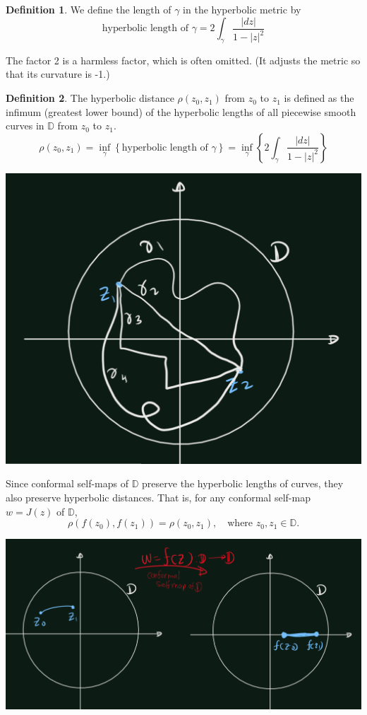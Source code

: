 \documentclass[
]{book}
\theoremstyle{definition}
\newtheorem{definition}{Definition}[chapter]
\theoremstyle{definition}
\theoremstyle{definition}
\theoremstyle{definition}
\theoremstyle{remark}
\begin{document}
\begin{definition}
\protect\hypertarget{def:unnamed-chunk-35}{}\label{def:unnamed-chunk-35}We define the length of \(\gamma\) in the hyperbolic metric by
\[\text{hyperbolic length of } \gamma =2\int_{\gamma} \frac{|dz|}{1-|z|^2}\]
\end{definition}

The factor 2 is a harmless factor, which is often omitted. (It adjusts the
metric so that its curvature is -1.)

\begin{definition}
\protect\hypertarget{def:unnamed-chunk-36}{}\label{def:unnamed-chunk-36}The hyperbolic distance \(\rho(z_0, z_1)\) from \(z_0\) to \(z_1\) is defined as the infimum (greatest lower bound) of the hyperbolic lengths of all piecewise smooth curves in \(\mathbb{D}\) from \(z_0\) to \(z_1\).
\[\rho(z_0, z_1)
  =\inf_\gamma\left\{\text{hyperbolic length of } \gamma \right\}
  =\inf_\gamma\left\{2\int_{\gamma} \frac{|dz|}{1-|z|^2}\right\}\]
\end{definition}

\includegraphics[width=14.76in]{figures/Riemann_Mapping_Therom/fig1}

Since conformal self-maps of \(\mathbb{D}\) preserve the hyperbolic lengths of curves, they also preserve hyperbolic distances. That is, for any conformal self-map \(w = J(z)\) of \(\mathbb{D}\),
\[ \rho(f(z_0), f(z_1)) = \rho(z_0, z_1), \quad \text{where } z_0, z_1 \in \mathbb{D}. \]

\includegraphics[width=23.78in]{figures/Riemann_Mapping_Therom/fig2}
\end{document}
